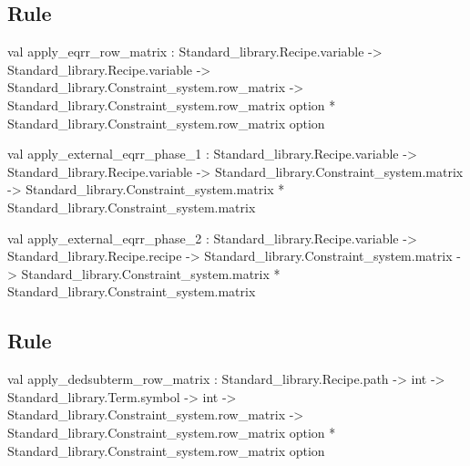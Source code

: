 \subsection{Rule \Eqrr  }




\label{val:Rules.apply-underscoreeqrr-underscorerow-underscorematrix}\begin{ocamldoccode}
val apply_eqrr_row_matrix :
  Standard_library.Recipe.variable ->
  Standard_library.Recipe.variable ->
  Standard_library.Constraint_system.row_matrix ->
  Standard_library.Constraint_system.row_matrix option *
  Standard_library.Constraint_system.row_matrix option
\end{ocamldoccode}




\label{val:Rules.apply-underscoreexternal-underscoreeqrr-underscorephase-underscore1}\begin{ocamldoccode}
val apply_external_eqrr_phase_1 :
  Standard_library.Recipe.variable ->
  Standard_library.Recipe.variable ->
  Standard_library.Constraint_system.matrix ->
  Standard_library.Constraint_system.matrix *
  Standard_library.Constraint_system.matrix
\end{ocamldoccode}




\label{val:Rules.apply-underscoreexternal-underscoreeqrr-underscorephase-underscore2}\begin{ocamldoccode}
val apply_external_eqrr_phase_2 :
  Standard_library.Recipe.variable ->
  Standard_library.Recipe.recipe ->
  Standard_library.Constraint_system.matrix ->
  Standard_library.Constraint_system.matrix *
  Standard_library.Constraint_system.matrix
\end{ocamldoccode}




\subsection{Rule \DedSubterms  }




\label{val:Rules.apply-underscorededsubterm-underscorerow-underscorematrix}\begin{ocamldoccode}
val apply_dedsubterm_row_matrix :
  Standard_library.Recipe.path ->
  int ->
  Standard_library.Term.symbol ->
  int ->
  Standard_library.Constraint_system.row_matrix ->
  Standard_library.Constraint_system.row_matrix option *
  Standard_library.Constraint_system.row_matrix option
\end{ocamldoccode}


